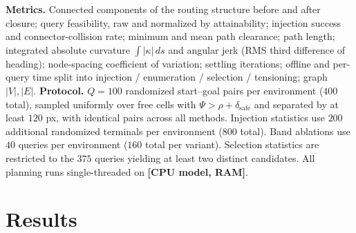 \documentclass[conference]{IEEEtran}
\newcommand{\PH}[1]{{\color{red}\textbf{[#1]}}}
\begin{document}
\textbf{Metrics.} Connected components of the routing structure before and after closure; query feasibility, raw and normalized by attainability; injection success and connector-collision rate; minimum and mean path clearance; path length; integrated absolute curvature $\int|\kappa|\,ds$ and angular jerk (RMS third difference of heading); node-spacing coefficient of variation; settling iterations; offline and per-query time split into injection / enumeration / selection / tensioning; graph $|V|,|E|$.
\textbf{Protocol.} $Q=100$ randomized start--goal pairs per environment ($400$ total), sampled uniformly over free cells with $\Psi>\rho+\delta_{\mathrm{safe}}$ and separated by at least $120$ px, with identical pairs across all methods. Injection statistics use $200$ additional randomized terminals per environment ($800$ total). Band ablations use $40$ queries per environment ($160$ total per variant). Selection statistics are restricted to the $375$ queries yielding at least two distinct candidates. All planning runs single-threaded on \PH{CPU model, RAM}.
\section{Results}
\label{sec:results}
\end{document}
